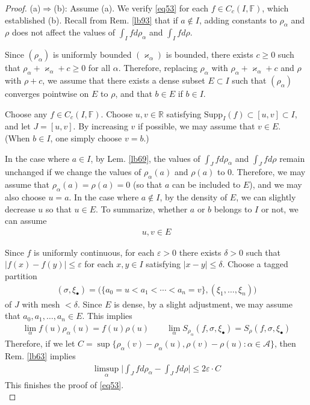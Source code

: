 \documentclass[12pt,b5paper,notitlepage]{article}
\theoremstyle{definition}
\theoremstyle{plain}
\newcommand{\scr}{\mathscr}
\newcommand{\blt}{\bullet}
\newcommand{\Rbb}{\mathbb R}
\newcommand{\Supp}{\mathrm{Supp}}
\newcommand{\Fbb}{\mathbb F}
\newcommand{\eps}{\varepsilon}
\newcommand{\vkp}{\varkappa}
\numberwithin{equation}{section}
\begin{document}
\begin{proof}
(a)$\Rightarrow$(b): Assume (a). We verify \eqref{eq53} for each $f\in C_c(I,\Fbb)$, which established (b). Recall from Rem. \ref{lb93} that if $a\notin I$, adding constants to $\rho_\alpha$ and $\rho$ does not affect the values of $\int_I fd\rho_\alpha$ and $\int_I fd\rho$. 

Since $(\rho_\alpha)$ is uniformly bounded $(\vkp_\alpha)$ is bounded, there exists $c\geq0$ such that $\rho_\alpha+\vkp_\alpha+c\geq0$ for all $\alpha$. Therefore, replacing $\rho_\alpha$ with $\rho_\alpha+\vkp_\alpha+c$ and $\rho$ with $\rho+c$, we assume that there exists a dense subset $E\subset I$ such that $(\rho_\alpha)$ converges pointwise on $E$ to $\rho$, and that $b\in E$ if $b\in I$.

Choose any $f\in C_c(I,\Fbb)$. Choose $u,v\in\Rbb$ satisfying $\Supp_I(f)\subset[u,v]\subset I$, and let $J=[u,v]$. By increasing $v$ if possible, we may assume that $v\in E$. (When $b\in I$, one simply choose $v=b$.) 

In the case where $a\in I$, by Lem. \ref{lb69}, the values of $\int_J fd\rho_\alpha$ and $\int_J fd\rho$ remain unchanged if we change the values of $\rho_\alpha(a)$ and $\rho(a)$ to $0$. Therefore,  we may assume that $\rho_\alpha(a)=\rho(a)=0$ (so that $a$ can be included to $E$), and we may also choose $u=a$. In the case where $a\notin I$, by the density of $E$, we can slightly decrease $u$ so that $u\in E$. To summarize, whether $a$ or $b$ belongs to $I$ or not, we can assume 
\begin{align*}
u,v\in E
\end{align*}

Since $f$ is uniformly continuous, for each $\eps>0$ there exists $\delta>0$ such that $|f(x)-f(y)|\leq\eps$ for each $x,y\in I$ satisfying $|x-y|\leq\delta$. Choose a tagged partition
\begin{align*}
(\sigma,\xi_\blt)=\big(\{a_0=u<a_1<\cdots<a_n=v\},(\xi_1,\dots,\xi_n) \big)
\end{align*}
of $J$ with mesh $<\delta$. Since $E$ is dense, by a slight adjustment, we may assume that $a_0,a_1,\dots,a_n\in E$. This implies
\begin{align*}
\lim_\alpha f(u)\rho_\alpha(u)=f(u)\rho(u)\qquad\lim_\alpha S_{\rho_\alpha}(f,\sigma,\xi_\blt)=S_\rho(f,\sigma,\xi_\blt)
\end{align*}
Therefore, if we let $C=\sup\{\rho_\alpha(v)-\rho_\alpha(u),\rho(v)-\rho(u):\alpha\in\scr A\}$, then Rem. \ref{lb63} implies
\begin{align*}
\limsup_\alpha \Big|\int_J fd\rho_\alpha-\int_J fd\rho\Big|\leq 2\eps\cdot C
\end{align*}
This finishes the proof of \eqref{eq53}.\\[-1ex]


\end{proof}
\end{document}
